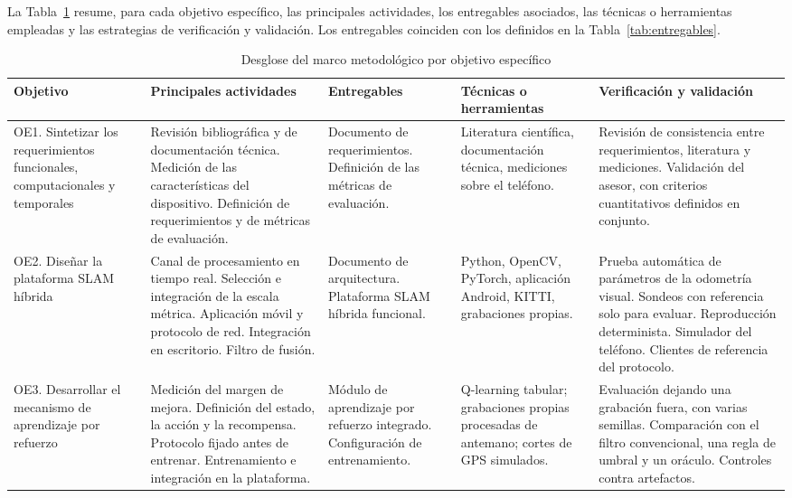 La Tabla~\ref{tab:met-desglose} resume, para cada objetivo específico, las principales actividades, los entregables asociados, las técnicas o herramientas empleadas y las estrategias de verificación y validación.
Los entregables coinciden con los definidos en la Tabla~\ref{tab:entregables}.

\begin{table}[H]
\centering
\caption{Desglose del marco metodológico por objetivo específico}
\label{tab:met-desglose}
\scriptsize
\renewcommand{\arraystretch}{1.15}
\begin{tabularx}{\textwidth}{@{}>{\raggedright\arraybackslash}p{2.1cm}>{\raggedright\arraybackslash}X>{\raggedright\arraybackslash}p{2.6cm}>{\raggedright\arraybackslash}p{2.5cm}>{\raggedright\arraybackslash}X@{}}
\toprule
\textbf{Objetivo} & \textbf{Principales actividades} & \textbf{Entregables} & \textbf{Técnicas o herramientas} & \textbf{Verificación y validación} \\
\midrule
OE1. Sintetizar los requerimientos funcionales, computacionales y temporales &
Revisión bibliográfica y de documentación técnica. Medición de las características del dispositivo. Definición de requerimientos y de métricas de evaluación. &
Documento de requerimientos. Definición de las métricas de evaluación. &
Literatura científica, documentación técnica, mediciones sobre el teléfono. &
Revisión de consistencia entre requerimientos, literatura y mediciones. Validación del asesor, con criterios cuantitativos definidos en conjunto. \\
\addlinespace
OE2. Diseñar la plataforma SLAM híbrida &
Canal de procesamiento en tiempo real. Selección e integración de la escala métrica. Aplicación móvil y protocolo de red. Integración en escritorio. Filtro de fusión. &
Documento de arquitectura. Plataforma SLAM híbrida funcional. &
Python, OpenCV, PyTorch, aplicación Android, KITTI, grabaciones propias. &
Prueba automática de parámetros de la odometría visual. Sondeos con referencia solo para evaluar. Reproducción determinista. Simulador del teléfono. Clientes de referencia del protocolo. \\
\addlinespace
OE3. Desarrollar el mecanismo de aprendizaje por refuerzo &
Medición del margen de mejora. Definición del estado, la acción y la recompensa. Protocolo fijado antes de entrenar. Entrenamiento e integración en la plataforma. &
Módulo de aprendizaje por refuerzo integrado. Configuración de entrenamiento. &
Q-learning tabular; grabaciones propias procesadas de antemano; cortes de GPS simulados. &
Evaluación dejando una grabación fuera, con varias semillas. Comparación con el filtro convencional, una regla de umbral y un oráculo. Controles contra artefactos. \\

\end{tabularx}
\end{table}
